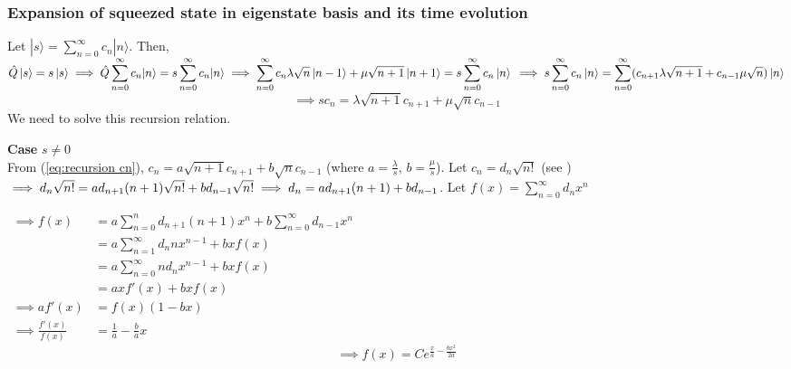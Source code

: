 \documentclass[12pt, twoside]{article}
\begin{document}
\subsubsection{Expansion of squeezed state in eigenstate basis and its time evolution}

Let $\displaystyle | s \rangle = \sum _ { n = 0 } ^ { \infty } c _ { n } | n \rangle$. Then, $\displaystyle\hat { Q } \ket{s} = s \ket{s} \implies \hat { Q } \sum _ { n = 0 } ^ { \infty } c _ { n } | n \rangle = s \sum _ { n = 0 } ^ { \infty } c _ { n } | n \rangle \\ \implies \sum _ { n = 0 } ^ { \infty } c _ { n } \lambda \sqrt{n} \ket{n-1} + \mu \sqrt{n+1} \ket{n+1} =s \sum _ { n = 0 } ^ { \infty } c _ { n } \ket{n} \\ \implies s \sum _ { n = 0 } ^ { \infty } c _ { n } \ket{n} = \sum _ { n = 0 } ^ { \infty } (c _ { n+1 } \lambda \sqrt{n+1} +c _ { n-1 } \mu \sqrt{n}) \ket{n}$ \begin{equation}\label{eq:recursion cn}\implies s c_n =  \lambda \sqrt{n+1} c _ { n+1 } + \mu \sqrt{n} c _ { n-1 }\end{equation} 
We need to solve this recursion relation.

\textbf{Case} $s \neq 0$
\\From (\ref{eq:recursion cn}), $ c_n =  a \sqrt{n+1} c _ { n+1 } + b \sqrt{n} c _ { n-1 }$ (where $a = \frac{\lambda}{s}$, $b = \frac{\mu}{s}$). Let $c_n = d_n \sqrt{n!}$ (see \cite{recursion_substitution}) \\ $\implies d_n \sqrt{n!} = a d_{n+1} (n+1) \sqrt{n!} + b d_{n-1} \sqrt{n!} \\ \implies d_n = a d_{n+1} (n+1)  + b d_{n-1}$. Let $\displaystyle f ( x ) = \sum _ { n = 0 } ^ { \infty } d _ { n } x ^ { n }$

$ \begin{aligned} \implies f ( x ) &= a \sum _ { n = 0 } ^ { n } d _ { n + 1 } ( n + 1 ) x ^ { n } + b \sum _ { n = 0 } ^ { \infty } d _ { n - 1 } x ^ { n } \\ &= { a  \sum _ { n = 1 } ^ { \infty } d _ { n } n x ^ { n - 1 } } + { b x f( x ) } \\ &=  { a \sum _ { n = 0 } ^ { \infty } n d_n x ^ { n - 1 } } + {  b x f ( x ) } \\ &= a x f'(x) + b x f(x) \\\implies a f'(x)  &= f(x) (1-bx)\\ \implies \frac{f'(x)}{f(x)} &= \frac{1}{a} - \frac{b}{a} x\end{aligned}$
\begin{equation}\label{eq:recursion_sol}
\implies f(x) = C e^{\frac{x}{a} - \frac{bx^2}{2a}}
\end{equation}
\end{document}
